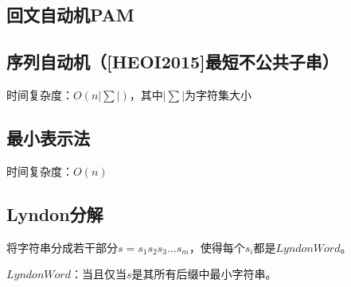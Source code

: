 \documentclass{article}
\begin{document}


\subsection{回文自动机PAM}



\subsection{序列自动机（[HEOI2015]最短不公共子串）}
时间复杂度：$O(n|\sum|)$，其中$|\sum|$为字符集大小


\subsection{最小表示法}
时间复杂度：$O(n)$


\subsection{Lyndon分解}
将字符串分成若干部分$s = s_{1}s_{2}s_{3}...s_{m}$，使得每个$s_{i}$都是$Lyndon Word$。\par
$Lyndon Word$：当且仅当$s$是其所有后缀中最小字符串。





\end{document}
